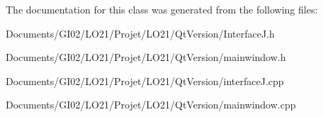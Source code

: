 The documentation for this class was generated from the following files\+:\begin{DoxyCompactItemize}
\item 
Documents/\+G\+I02/\+L\+O21/\+Projet/\+L\+O21/\+Qt\+Version/Interface\+J.\+h\item 
Documents/\+G\+I02/\+L\+O21/\+Projet/\+L\+O21/\+Qt\+Version/mainwindow.\+h\item 
Documents/\+G\+I02/\+L\+O21/\+Projet/\+L\+O21/\+Qt\+Version/interface\+J.\+cpp\item 
Documents/\+G\+I02/\+L\+O21/\+Projet/\+L\+O21/\+Qt\+Version/mainwindow.\+cpp\end{DoxyCompactItemize}
